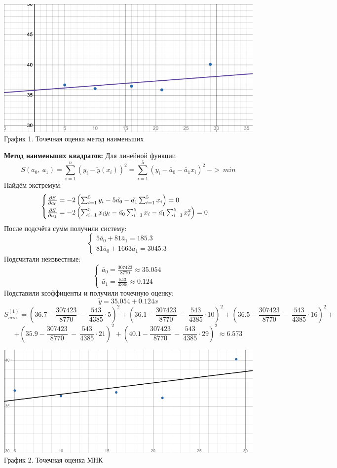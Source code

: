 \documentclass{article}
\begin{document}
\begin{center}
    \includegraphics[width=.8\textwidth]{toch.png}\\
    График 1. Точечная оценка метод наименьших
\end{center}
\textbf{Метод наименьших квадратов:}
Для линейной функции
\[S(a_0,\ a_1) = \sum_{i=1}^{n}(y_i - \tilde{y}(x_i))^2 = \sum_{i=1}^{5}(y_i - \tilde{a_0} - \tilde{a_1}x_i)^2\ ->\ min\]
Найдём экстремум:
\[\begin{cases}
    \pdv{S}{a_0} = -2\left(\sum_{i=1}^{5}y_i - 5\tilde{a_0} - \tilde{a_1}\sum_{i=1}^{5}x_i\right) = 0\\
    \pdv{S}{a_1} = -2\left(\sum_{i=1}^{5}x_iy_i - \tilde{a_0}\sum_{i=1}^{5}x_i - \tilde{a_1}\sum_{i=1}^{5}x_i^2\right) = 0
\end{cases}\]
После подсчёта сумм получили систему:
\[\begin{cases}
    5\tilde{a_0} + 81\tilde{a_1} = 185.3\\
    81\tilde{a_0} + 1663\tilde{a_1} = 3045.3
\end{cases}\]
Подсчитали неизвестные:
\[\begin{cases}
    \tilde{a_0} = \frac{307423}{8770} \approx 35.054\\
    \tilde{a_1} = \frac{543}{4385} \approx0.124
\end{cases}\]
Подставили коэффиценты и получили точечную оценку:
\[\tilde{y} = 35.054+0.124x\]
\[S_{min}^{(1)} = \left(36.7-\frac{307423}{8770}\ -\ \frac{543}{4385}\cdot5\right)^{2}+\left(36.1-\frac{307423}{8770}\ -\ \frac{543}{4385}\cdot10\right)^{2}+\left(36.5-\frac{307423}{8770}\ -\ \frac{543}{4385}\cdot16\right)^{2}
+\]
\[+\left(35.9-\frac{307423}{8770}\ -\ \frac{543}{4385}\cdot21\right)^{2}+\left(40.1-\frac{307423}{8770}\ -\ \frac{543}{4385}\cdot29\right)^{2} \approx 6.573\]
\begin{center}
    \includegraphics[width=.8\textwidth]{next.png}\\
    График 2. Точечная оценка МНК
\end{center}
\end{document}
